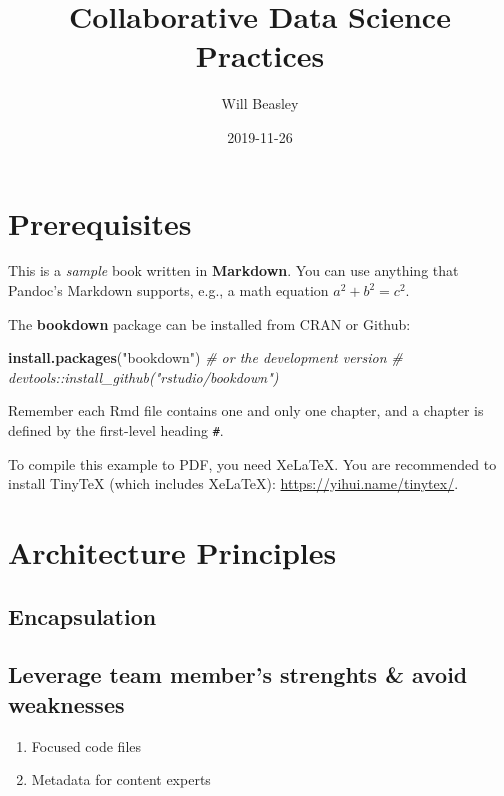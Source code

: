 \documentclass[]{book}
\title{Collaborative Data Science Practices}
\author{Will Beasley}
\date{2019-11-26}
\newenvironment{Shaded}{\begin{snugshade}}{\end{snugshade}}
\newcommand{\CommentTok}[1]{\textcolor[rgb]{0.56,0.35,0.01}{\textit{#1}}}
\newcommand{\KeywordTok}[1]{\textcolor[rgb]{0.13,0.29,0.53}{\textbf{#1}}}
\newcommand{\NormalTok}[1]{#1}
\newcommand{\StringTok}[1]{\textcolor[rgb]{0.31,0.60,0.02}{#1}}
\providecommand{\tightlist}{%
  \setlength{\itemsep}{0pt}\setlength{\parskip}{0pt}}
\begin{document}
\maketitle

{
\setcounter{tocdepth}{1}
\tableofcontents
}
\hypertarget{prerequisites}{%
\chapter{Prerequisites}\label{prerequisites}}

This is a \emph{sample} book written in \textbf{Markdown}. You can use anything that Pandoc's Markdown supports, e.g., a math equation \(a^2 + b^2 = c^2\).

The \textbf{bookdown} package can be installed from CRAN or Github:

\begin{Shaded}
\begin{Highlighting}[]
\KeywordTok{install.packages}\NormalTok{(}\StringTok{"bookdown"}\NormalTok{)}
\CommentTok{# or the development version}
\CommentTok{# devtools::install_github("rstudio/bookdown")}
\end{Highlighting}
\end{Shaded}

Remember each Rmd file contains one and only one chapter, and a chapter is defined by the first-level heading \texttt{\#}.

To compile this example to PDF, you need XeLaTeX. You are recommended to install TinyTeX (which includes XeLaTeX): \url{https://yihui.name/tinytex/}.

\hypertarget{architecture}{%
\chapter{Architecture Principles}\label{architecture}}

\hypertarget{encapsulation}{%
\section{Encapsulation}\label{encapsulation}}

\hypertarget{leverage-team-members-strenghts-avoid-weaknesses}{%
\section{Leverage team member's strenghts \& avoid weaknesses}\label{leverage-team-members-strenghts-avoid-weaknesses}}

\begin{enumerate}
\def\labelenumi{\arabic{enumi}.}
\tightlist
\item
  Focused code files
\item
  Metadata for content experts
\end{enumerate}
\end{document}
